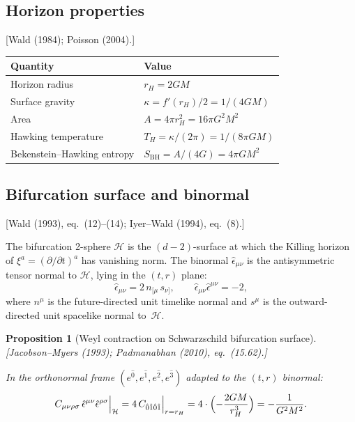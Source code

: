 \documentclass[12pt,a4paper]{article}
\newtheorem{proposition}{Proposition}[section]
\theoremstyle{definition}
\theoremstyle{remark}
\newcommand{\fromlit}[1]{\textcolor{blue!70!black}{\textsf{[#1]}}}
\begin{document}
\subsection{Horizon properties}
\fromlit{Wald (1984); Poisson (2004).}

\begin{center}
\begin{tabular}{ll}
\toprule
Quantity & Value \\
\midrule
Horizon radius & $r_H = 2GM$ \\
Surface gravity & $\kappa = f'(r_H)/2 = 1/(4GM)$ \\
Area & $A = 4\pi r_H^2 = 16\pi G^2 M^2$ \\
Hawking temperature & $T_H = \kappa/(2\pi) = 1/(8\pi GM)$ \\
Bekenstein--Hawking entropy & $S_{\mathrm{BH}} = A/(4G) = 4\pi G M^2$ \\
\bottomrule
\end{tabular}
\end{center}

\subsection{Bifurcation surface and binormal}
\fromlit{Wald (1993), eq.~(12)--(14); Iyer--Wald (1994), eq.~(8).}

The bifurcation 2-sphere $\mathcal{H}$ is the $(d-2)$-surface at which the
Killing horizon of $\xi^a = (\partial/\partial t)^a$ has vanishing norm.
The binormal $\hat{\epsilon}_{\mu\nu}$ is the antisymmetric tensor normal to
$\mathcal{H}$, lying in the $(t,r)$ plane:
\begin{equation}\label{eq:binormal}
  \hat{\epsilon}_{\mu\nu} = 2\,n_{[\mu}\,s_{\nu]},
  \qquad \hat{\epsilon}_{\mu\nu}\hat{\epsilon}^{\mu\nu} = -2,
\end{equation}
where $n^\mu$ is the future-directed unit timelike normal and $s^\mu$ is
the outward-directed unit spacelike normal to~$\mathcal{H}$.

\begin{proposition}[Weyl contraction on Schwarzschild bifurcation surface]
\label{prop:weyl-binormal}
\fromlit{Jacobson--Myers (1993); Padmanabhan (2010), eq.~(15.62).}

In the orthonormal frame $(e^{\hat{0}}, e^{\hat{1}},
e^{\hat{2}}, e^{\hat{3}})$ adapted to the $(t,r)$ binormal:
\begin{equation}\label{eq:C-binormal}
  C_{\mu\nu\rho\sigma}\,\hat{\epsilon}^{\mu\nu}\hat{\epsilon}^{\rho\sigma}
  \Big|_{\mathcal{H}}
  = 4\,C_{\hat{0}\hat{1}\hat{0}\hat{1}}\Big|_{r=r_H}
  = 4 \cdot \Bigl(-\frac{2GM}{r_H^3}\Bigr)
  = -\frac{1}{G^2 M^2}.
\end{equation}
\end{proposition}
\end{document}
